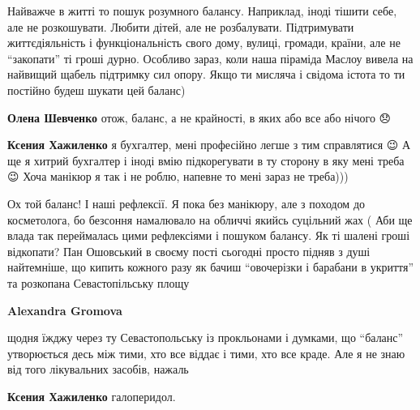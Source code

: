  
 
 
 
 

\qqSecCmt


Найважче в житті то пошук розумного балансу. Наприклад, іноді тішити себе, але
не розкошувати. Любити дітей, але не розбалувати. Підтримувати життєдіяльність
і функціональність свого дому, вулиці, громади, країни, але не \enquote{закопати} ті
гроші дурно. Особливо зараз, коли наша піраміда Маслоу вивела на найвищий
щабель підтримку сил опору. Якщо ти мисляча і свідома істота то ти постійно
будеш шукати цей баланс)

\begin{itemize} %
\textbf{Олена Шевченко} отож, баланс, а не крайності, в яких або все або нічого 😞

\textbf{Ксения Хажиленко} я бухгалтер, мені професійно легше з тим справлятися 😉 А ще я хитрий бухгалтер і іноді вмію підкорегувати в ту сторону в яку мені треба 😉 Хоча манікюр я так і не роблю, напевне то мені зараз не треба)))
\end{itemize} %


Ох той баланс! І наші рефлексії. Я пока без манікюру, але з походом до
косметолога, бо безсоння намалювало на обличчі якийсь суцільний жах ( Аби ще
влада так переймалась цими рефлексіями і пошуком балансу. Як ті шалені гроші
відкопати? Пан Ошовський в своєму пості сьогодні просто підняв з душі
найтемніше, що кипить кожного разу як бачиш \enquote{овочерізки і барабани в укриття}
та розкопана Севастопільську площу

\begin{itemize} %
\textbf{Alexandra Gromova} 

щодня їжджу через ту Севастопольську із прокльонами і думками, що \enquote{баланс}
утворюється десь між тими, хто все віддає і тими, хто все краде. Але я не знаю
від того лікувальних засобів, нажаль

\textbf{Ксения Хажиленко} галоперидол.
\end{itemize} %

